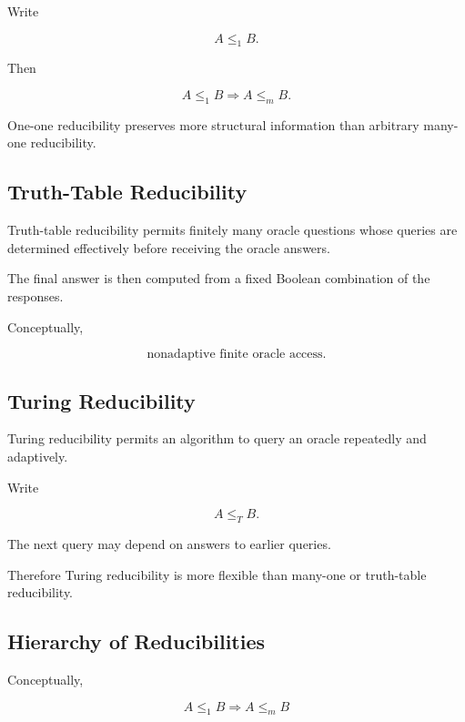 Write

\[
\boxed{
A\leq_1B.
}
\]

Then

\[
\boxed{
A\leq_1B
\Longrightarrow
A\leq_mB.
}
\]

One-one reducibility preserves more structural information than arbitrary
many-one reducibility.

\subsection{Truth-Table Reducibility}
\label{subsec:truth-table-reducibility}

Truth-table reducibility permits finitely many oracle questions whose
queries are determined effectively before receiving the oracle answers.

The final answer is then computed from a fixed Boolean combination of the
responses.

Conceptually,

\[
\boxed{
\text{nonadaptive finite oracle access}.
}
\]

\subsection{Turing Reducibility}
\label{subsec:recursion-turing-reducibility}

Turing reducibility permits an algorithm to query an oracle repeatedly and
adaptively.

Write

\[
\boxed{
A\leq_TB.
}
\]

The next query may depend on answers to earlier queries.

Therefore Turing reducibility is more flexible than many-one or
truth-table reducibility.

\subsection{Hierarchy of Reducibilities}
\label{subsec:hierarchy-reducibilities}

Conceptually,

\[
\boxed{
A\leq_1B
\Longrightarrow
A\leq_mB
}
\]

